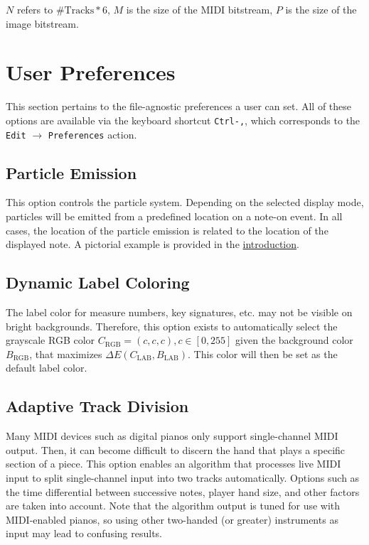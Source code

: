 \documentclass[english]{article}
\providecommand{\mi}[1]{\texttt{#1}}
\begin{document}
\vspace{1em}

$N$ refers to $\text{\# Tracks}*6$, $M$ is the size of the MIDI bitstream, $P$ is the size of the image bitstream.

\newpage

\section{User Preferences}

This section pertains to the file-agnostic preferences a user can set.
All of these options are available via the keyboard shortcut \mi{Ctrl-,},
which corresponds to the \mi{Edit} $\rightarrow$ \mi{Preferences} action.

\subsection{Particle Emission}

This option controls the particle system. Depending on the selected display mode, particles will be emitted from a 
predefined location on a note-on event. In all cases, the location of the particle emission is related to the location of the
displayed note. A pictorial example is provided in the 
\textcolor{lcol}{\hyperref[sec:intro]{introduction}}.

\subsection{Dynamic Label Coloring}

The label color for measure numbers, key signatures, etc. may not be visible on bright backgrounds. Therefore,
this option exists to automatically select the grayscale RGB color $C_\text{RGB}=(c,c,c), c \in [0, 255]$
given the background color $B_\text{RGB}$,
that maximizes $\Delta E(C_\text{LAB}, B_\text{LAB})$.
This color will then be set as the default label color.

\subsection{Adaptive Track Division}

Many MIDI devices such as digital pianos only support single-channel MIDI output. Then, it can become difficult to discern the
hand that plays a specific section of a piece. This option enables an algorithm that processes live MIDI input to split
single-channel input into two tracks automatically. Options such as the time differential between successive notes, 
player hand size, and other factors are taken into account. Note that the algorithm output is tuned for use with MIDI-enabled
pianos, so using other two-handed (or greater) instruments as input may lead to confusing results.
\end{document}
